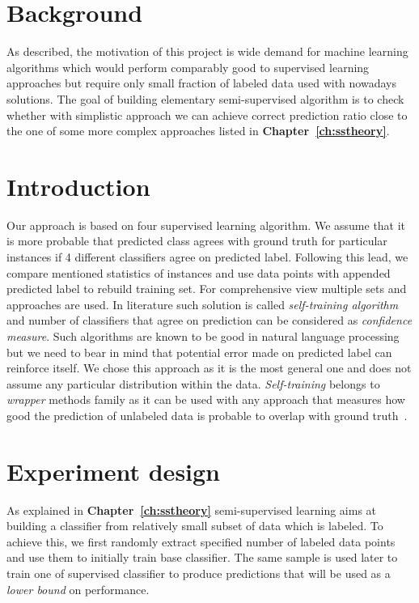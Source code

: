 \documentclass[12pt, a4paper, pdflatex]{report}
\begin{document}
\section{Background}
As described, the motivation of this project is wide demand for machine learning algorithms which would perform comparably good to supervised learning approaches but require only small fraction of labeled data used with nowadays solutions. The goal of building elementary semi-supervised algorithm is to check whether with simplistic approach we can achieve correct prediction ratio close to the one of some more complex approaches listed in \textbf{Chapter~\ref{ch:sstheory}}. 

\section{Introduction}
Our approach is based on four supervised learning algorithm. We assume that it is more probable that predicted class agrees with ground truth for particular instances if 4 different classifiers agree on predicted label. Following this lead, we compare mentioned statistics of instances and use data points with appended predicted label to rebuild training set. For comprehensive view multiple sets and approaches are used. In literature such solution is called \emph{self-training algorithm} and number of classifiers that agree on prediction can be considered as \emph{confidence measure}. Such algorithms are known to be good in natural language processing but we need to bear in mind that potential error made on predicted label can reinforce itself. We chose this approach as it is the most general one and does not assume any particular distribution within the data. \emph{Self-training} belongs to \emph{wrapper} methods family as it can be used with any approach that measures how good the prediction of unlabeled data is probable to overlap with ground truth~\cite{zhu2009introduction}.

\section{Experiment design}
As explained in \textbf{Chapter~\ref{ch:sstheory}} semi-supervised learning aims at building a classifier from relatively small subset of data which is labeled. To achieve this, we first randomly extract specified number of labeled data points and use them to initially train base classifier. The same sample is used later to train one of supervised classifier to produce predictions that will be used as a \emph{lower bound} on performance.
\end{document}
